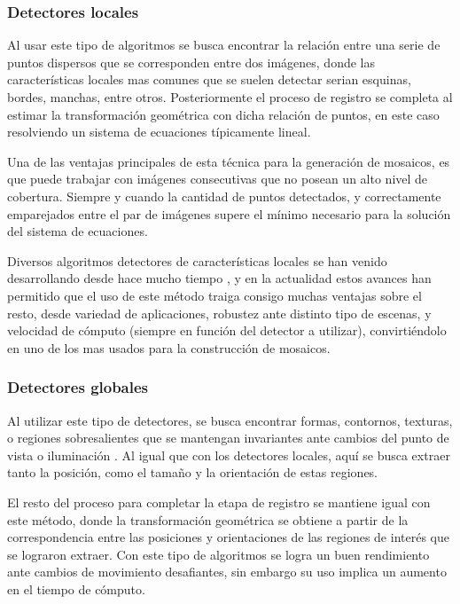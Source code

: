 \subsubsection*{Detectores locales}

Al usar este tipo de algoritmos se busca encontrar la relación entre una serie de puntos dispersos que se corresponden entre dos imágenes, donde las características locales mas comunes que se suelen detectar serian esquinas, bordes, manchas, entre otros. Posteriormente el proceso de registro se completa al estimar la transformación geométrica con dicha relación de puntos, en este caso resolviendo un sistema de ecuaciones típicamente lineal.

Una de las ventajas principales de esta técnica para la generación de mosaicos, es que puede trabajar con imágenes consecutivas que no posean un alto nivel de cobertura. Siempre y cuando la cantidad de puntos detectados, y correctamente emparejados entre el par de imágenes supere el mínimo necesario para la solución del sistema de ecuaciones.

Diversos algoritmos detectores de características locales se han venido desarrollando desde hace mucho tiempo \cite{harris,sift,surf,fast,brief,orb,kaze,akaze}, y en la actualidad estos avances han permitido que el uso de este método traiga consigo muchas ventajas sobre el resto, desde variedad de aplicaciones, robustez ante distinto tipo de escenas, y velocidad de cómputo (siempre en función del detector a utilizar), convirtiéndolo en uno de los mas usados para la construcción de mosaicos.

\subsubsection*{Detectores globales}

Al utilizar este tipo de detectores, se busca encontrar formas, contornos, texturas, o regiones sobresalientes que se mantengan invariantes ante cambios del punto de vista o iluminación \cite{high-level}. Al igual que con los detectores locales, aquí se busca extraer tanto la posición, como el tamaño y la orientación de estas regiones.

El resto del proceso para completar la etapa de registro se mantiene igual con este método, donde la transformación geométrica se obtiene a partir de la correspondencia entre las posiciones y orientaciones de las regiones de interés que se lograron extraer. Con este tipo de algoritmos se logra un buen rendimiento ante cambios de movimiento desafiantes, sin embargo su uso implica un aumento en el tiempo de cómputo.

